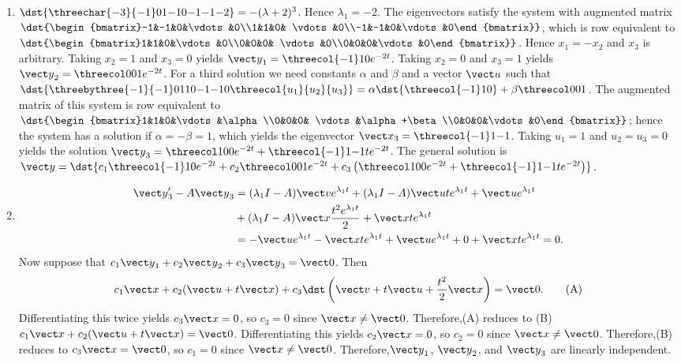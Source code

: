 \documentclass[openany]{book}
\newenvironment{sectionSolutions}{
 \begin{enumerate}[item-label={\thesection.\arabic{enumi}.}]
}{
 \end{enumerate}
}
\begin{document}
\begin{sectionSolutions}
\item
$\dst{\threechar{-3}{-1}01{-1}0{-1}{-1}{-2}}
=-(\lambda+2)^3$.
Hence $\lambda_1=-2$.
The eigenvectors
 satisfy the system with  augmented matrix
$\dst{\begin{bmatrix}-1&-1&0&\vdots&0\\1&1&0&
\vdots&0\\-1&-1&0&\vdots&0\end{bmatrix}}$,
which is row equivalent to
$\dst{\begin{bmatrix}1&1&0&\vdots&0\\0&0&0&
\vdots&0\\0&0&0&\vdots&0\end{bmatrix}}$.
Hence  $x_1=-x_2$ and $x_3$ is arbitrary.  Taking $x_2=1$ and $x_3=0$
yields
${\vect y}_1=\threecol{-1}10e^{-2t}$.
Taking  $x_2=0$ and $x_3=1$ yields
  ${\vect y}_2=\threecol001e^{-2t}$.
For a third solution we need constants $\alpha$ and $\beta$  and a
vector ${\vect u}$ such that
$\dst{\threebythree{-1}{-1}0110{-1}{-1}0\threecol{u_1}{u_2}{u_3}}
=\alpha\dst{\threecol{-1}10}+\beta\threecol001$.
The augmented matrix of this system is row equivalent to
$\dst{\begin{bmatrix}1&1&0&\vdots&\alpha\\0&0&0&
\vdots&\alpha+\beta\\0&0&0&\vdots&0\end{bmatrix}}$;
hence the system
has a solution if $\alpha=-\beta=1$, which yields the eigenvector
${\vect x}_3=\threecol{-1}1{-1}$. Taking $u_1=1$  and $u_2=u_3=0$
yields the solution
${\vect y}_3=
\threecol100e^{-2t}+\threecol{-1}1{-1}te^{-2t}$.
The general solution is
 ${\vect y}=\dst{
c_1\threecol{-1}10e^{-2t}+c_2\threecol001e^{-2t}+c_3\left
(\threecol100e^{-2t}+\threecol{-1}1{-1}te^{-2t}\right)}$.


\item
\begin{align*}
{\vect y}_3'-A{\vect y}_3&=(\lambda_1I-A){\vect v}e^{\lambda_1t}
+(\lambda_1I-A){\vect u}te^{\lambda_1t}+{\vect u}e^{\lambda_1t}\\
&+(\lambda_1I-A){\vect x}\frac{t^2e^{\lambda_1t}}{2}+{\vect
x}te^{\lambda_1t}\\
&=-{\vect u}e^{\lambda_1t}-{\vect x}te^{\lambda_1t}+{\vect
u}e^{\lambda_1t}+0+{\vect x}te^{\lambda_1t}=0.
\end{align*}
Now suppose that $c_1{\vect y}_1+c_2{\vect y}_2+c_3{\vect y}_3={\vect 0}$.
Then
\[
 c_1{\vect x}+c_2({\vect u}+t{\vect x})+c_3\dst\left({\vect
v}+t{\vect u}+\frac{t^2}{2}{\vect x}\right)={\vect 0}.
\tag{A}
\]
Differentiating this twice yields $c_3{\vect x}=0$, so $c_3=0$ since
${\vect x}\ne{\vect 0}$. Therefore,(A) reduces to
(B) $c_1{\vect x}+c_2({\vect u}+t{\vect x})={\vect 0}$.
Differentiating this yields $c_2{\vect x}=0$, so $c_2=0$ since
${\vect x}\ne{\vect 0}$. Therefore,(B) reduces to $c_3{\vect x}={\vect 0}$,
so $c_1=0$ since
${\vect x}\ne{\vect 0}$. Therefore,${\vect y}_1$, ${\vect y}_2$, and ${\vect
y}_3$ are linearly independent.
\end{sectionSolutions}
\end{document}
